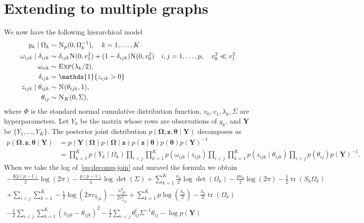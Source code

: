\documentclass[a4paper, 11pt, oneside]{report}
\DeclareMathOperator{\tr}{tr}
\newcommand{\1}{\mathds{1}}
\newcommand{\inv}{^{-1}}
\newcommand{\Np}{\textsc{N}_p}
\newcommand{\Nor}{\textsc{N}}
\newcommand{\Exp}{\textsc{Exp}}
\newcommand{\bOmega}{\mathbf{\Omega}}
\newcommand{\bz}{\mathbf{z}}
\newcommand{\btheta}{\mathbf{\theta}}
\newcommand{\bY}{\mathbf{Y}}
\begin{document}
\chapter{Extending to multiple graphs}
We now have the following hierarchical model
\begin{align*}
	y_k \mid \Omega_k              & \sim \Np(0, \Omega_k^{-1}), \quad k=1,\dots,K                                                                     \\
	\omega_{ijk} \mid \delta_{ijk} & \sim \delta_{ijk} \Nor(0, v_1^2) + (1 - \delta_{ijk}) \Nor(0, v_0^2) \quad i,j = 1,\dots,p, \quad v_0^2 \ll v_1^2 \\
	\omega_{iik}                   & \sim \Exp(\lambda_k/2),                                                                                           \\
	\delta_{ijk}                   & = \1\{z_{ijk} > 0\}                                                                                               \\
	z_{ijk} \mid \theta_{ijk}      & \sim \Nor(\theta_{ijk}, 1),                                                                                       \\
	\theta_{ij}                    & \sim \textsc{N}_K(0, \Sigma),
\end{align*}
where $\Phi$ is the standard normal cumulative distribution function, $v_0,
	v_1, \lambda_k, \Sigma$ are hyperparameters.
Let $Y_k$ be the matrix whose rows are observations of $y_k$, and $\mathbf{Y}$
be $\{Y_1,\dots,Y_K\}$.
The posterior joint distribution $p(\mathbf{\Omega},  \mathbf{z},
	\mathbf{\theta} \mid \mathbf{Y})$ decomposes as
\begin{align}\label{eq:decomp-join}
	p(\bOmega,  \bz, \btheta \mid \bY) & = p(\bY \mid \bOmega) p(\bOmega \mid \bz)
	p(\bz \mid \btheta) p(\btheta) p(\bY)\inv \nonumber                            \\
	                                   & = \prod_{k=1}^K p(Y_k \mid \Omega_k)
	\prod_{i < j}\prod_{k=1}^K p(\omega_{ijk}
	\mid z_{ijk}) \prod_{i < j}\prod_{k=1}^K
	p(z_{ijk} \mid \theta_{ijk})\prod_{i <
		j} p(\theta_{ij}) p(\bY)\inv.
\end{align}
When we take the log of~\ref{eq:decomp-join} and unravel the formula we obtain
\begin{multline}\label{eq:mg-joint}
	- \frac{Kp(p-1)}{2} \log(2\pi) - \frac{p(p-1)}{4} \log\det(\Sigma) + \sum_{k=1}^K \frac{n_k}{2} \log\det(\Omega_k) - \frac{p n_k}{2} \log(2 \pi) -\frac{1}{2} \tr(S_k \Omega_k) \\
	+ \sum_{i < j}\sum_{k=1}^K -\frac{1}{2} \log(2 \pi v_{\delta_{ijk}}) - \frac{\omega_{ijk}^2}{2 v_{\delta_{ijk}}^2} + \sum_{k=1}^K p \log\left(\frac{\lambda_k}{2}\right) - \frac{\lambda_k}{2} \tr(\Omega_k)  \\
	-\frac{1}{2} \sum_{i < j}\sum_{k=1}^K (z_{ijk} - \theta_{ijk})^2  -\frac{1}{2} \sum_{i < j} \theta_{ij}^t \Sigma\inv \theta_{ij} - \log p(\bY)
\end{multline}
\end{document}
